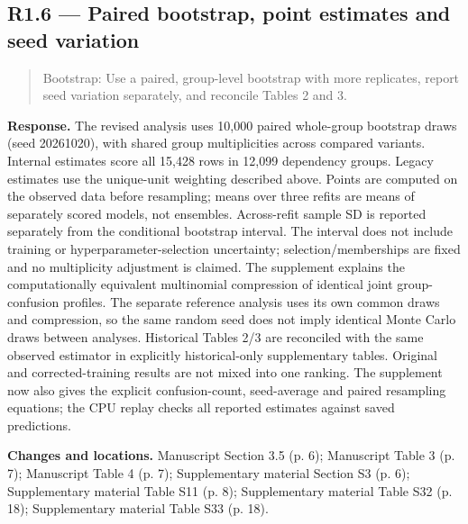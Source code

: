\documentclass[11pt,a4paper]{article}
\begin{document}
\subsection*{R1.6 — Paired bootstrap, point estimates and seed variation}
\begin{quote}\small Bootstrap: Use a paired, group-level bootstrap with more replicates, report seed variation separately, and reconcile Tables 2 and 3.\end{quote}
\textbf{Response.} The revised analysis uses 10,000 paired whole-group bootstrap draws (seed 20261020), with shared group multiplicities across compared variants. Internal estimates score all 15,428 rows in 12,099 dependency groups. Legacy estimates use the unique-unit weighting described above. Points are computed on the observed data before resampling; means over three refits are means of separately scored models, not ensembles. Across-refit sample SD is reported separately from the conditional bootstrap interval. The interval does not include training or hyperparameter-selection uncertainty; selection/memberships are fixed and no multiplicity adjustment is claimed. The supplement explains the computationally equivalent multinomial compression of identical joint group-confusion profiles. The separate reference analysis uses its own common draws and compression, so the same random seed does not imply identical Monte Carlo draws between analyses. Historical Tables 2/3 are reconciled with the same observed estimator in explicitly historical-only supplementary tables. Original and corrected-training results are not mixed into one ranking. The supplement now also gives the explicit confusion-count, seed-average and paired resampling equations; the CPU replay checks all reported estimates against saved predictions.

\textbf{Changes and locations.} Manuscript Section 3.5 (p. 6); Manuscript Table 3 (p. 7); Manuscript Table 4 (p. 7); Supplementary material Section S3 (p. 6); Supplementary material Table S11 (p. 8); Supplementary material Table S32 (p. 18); Supplementary material Table S33 (p. 18).
\end{document}
